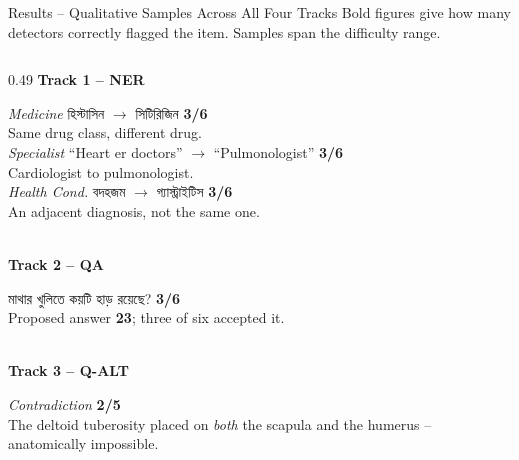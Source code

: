 \documentclass[aspectratio=169,11pt]{beamer}
\newcommand{\bng}[1]{{\bn #1}}
\begin{document}
\begin{frame}[shrink=12]{Results \;--\; Qualitative Samples Across All Four Tracks}
\vspace{-3mm}
{\scriptsize\color{soft}Bold figures give how many detectors correctly flagged the item. Samples span the difficulty range.}\\[1.5mm]
{\scriptsize
\begin{columns}[T]
\begin{column}{0.49\textwidth}
\textbf{Track 1 -- NER}\\[1mm]
\colorbox{panel}{\begin{minipage}{0.96\textwidth}\vspace{.7mm}
\emph{Medicine}\; \bng{হিস্টাসিন} $\rightarrow$ \bng{সিটিরিজিন} \hfill \textbf{3/6}\\
{\color{soft}Same drug class, different drug.}\\[1.2mm]
\emph{Specialist}\; ``Heart er doctors'' $\rightarrow$ ``Pulmonologist'' \hfill \textbf{3/6}\\
{\color{soft}Cardiologist to pulmonologist.}\\[1.2mm]
\emph{Health Cond.}\; \bng{বদহজম} $\rightarrow$ \bng{গ্যাস্ট্রাইটিস} \hfill \textbf{3/6}\\
{\color{soft}An adjacent diagnosis, not the same one.}
\vspace{.7mm}\end{minipage}}\\[1.8mm]
\textbf{Track 2 -- QA}\\[1mm]
\colorbox{panel}{\begin{minipage}{0.96\textwidth}\vspace{.7mm}
\bng{মাথার খুলিতে কয়টি হাড় রয়েছে?} \hfill \textbf{3/6}\\
{\color{soft}Proposed answer \textbf{23}; three of six accepted it.}
\vspace{.7mm}\end{minipage}}\\[1.8mm]
\textbf{Track 3 -- Q-ALT}\\[1mm]
\colorbox{panel}{\begin{minipage}{0.96\textwidth}\vspace{.7mm}
\emph{Contradiction} \hfill \textbf{2/5}\\
{\color{soft}The deltoid tuberosity placed on \emph{both} the scapula and the humerus -- anatomically impossible.}
\vspace{.7mm}\end{minipage}}

\end{column}
\end{columns}}
\end{frame}
\end{document}
